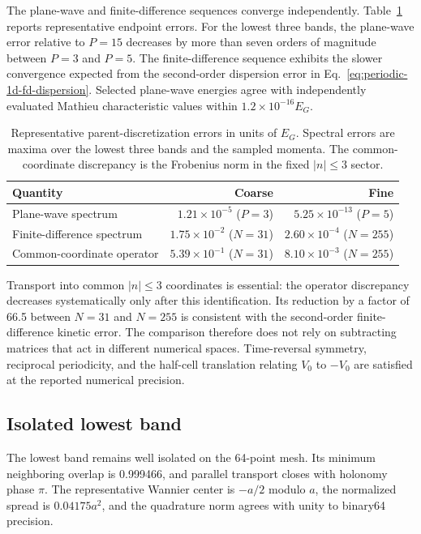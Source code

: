 The plane-wave and finite-difference sequences converge independently.
Table~\ref{tab:periodic-1d-parent-convergence} reports representative endpoint
errors. For the lowest three bands, the plane-wave error relative to $P=15$
decreases by more than seven orders of magnitude between $P=3$ and $P=5$. The
finite-difference sequence exhibits the slower convergence expected from the
second-order dispersion error in
Eq.~\eqref{eq:periodic-1d-fd-dispersion}. Selected plane-wave energies agree
with independently evaluated Mathieu characteristic values within
$1.2\times10^{-16}E_G$.

\begin{table}[htbp]
  \centering
  \caption{Representative parent-discretization errors in units of $E_G$.
  Spectral errors are maxima over the lowest three bands and the sampled
  momenta. The common-coordinate discrepancy is the Frobenius norm in the fixed
  $|n|\leq3$ sector.}
  \label{tab:periodic-1d-parent-convergence}
  \small
  \begin{tabular}{lrr}
    \toprule
    Quantity & Coarse & Fine \\
    \midrule
    Plane-wave spectrum &
    $1.21\times10^{-5}$ ($P=3$) & $5.25\times10^{-13}$ ($P=5$) \\
    Finite-difference spectrum &
    $1.75\times10^{-2}$ ($N=31$) & $2.60\times10^{-4}$ ($N=255$) \\
    Common-coordinate operator &
    $5.39\times10^{-1}$ ($N=31$) & $8.10\times10^{-3}$ ($N=255$) \\
    \bottomrule
  \end{tabular}
\end{table}

Transport into common $|n|\leq3$ coordinates is essential: the operator
discrepancy decreases systematically only after this identification. Its
reduction by a factor of 66.5 between $N=31$ and $N=255$ is consistent with the
second-order finite-difference kinetic error. The comparison therefore does not
rely on subtracting matrices that act in different numerical spaces.
Time-reversal symmetry, reciprocal periodicity,
and the half-cell translation relating $V_0$ to $-V_0$ are satisfied at the
reported numerical precision.

\subsection{Isolated lowest band}

The lowest band remains well isolated on the 64-point mesh. Its minimum
neighboring overlap is 0.999466, and parallel transport closes with holonomy
phase $\pi$. The representative Wannier center is $-a/2$ modulo $a$, the
normalized spread is $0.04175a^2$, and the quadrature norm agrees with unity to
binary64 precision.


